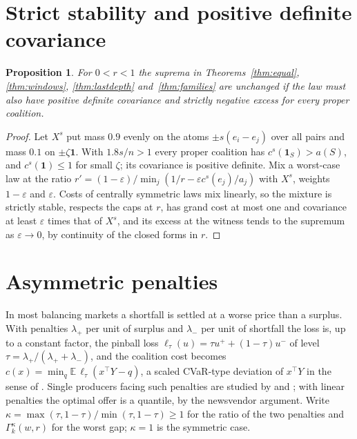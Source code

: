 \documentclass[11pt,a4paper]{article}
\newtheorem{proposition}[theorem]{Proposition}
\theoremstyle{remark}
\newcommand{\one}{\mathbf 1}
\newcommand{\E}{\mathbb E}
\begin{document}
\section{Strict stability and positive definite covariance}

\begin{proposition}\label{prop:mixtures}
For $0<r<1$ the suprema in Theorems~\ref{thm:equal}, \ref{thm:windows},
\ref{thm:lastdepth} and~\ref{thm:families} are unchanged if the law must also
have positive definite covariance and strictly negative excess for every proper
coalition.
\end{proposition}

\begin{proof}
Let $X^s$ put mass $0.9$ evenly on the atoms $\pm s(e_i-e_j)$ over all pairs
and mass $0.1$ on $\pm\zeta\one$. With $1.8s/n>1$ every proper coalition has
$c^s(\one_S)>a(S)$, and $c^s(\one)\le1$ for small $\zeta$; its covariance is
positive definite. Mix a worst-case law at the ratio
$r'=(1-\varepsilon)/\min_j(1/r-\varepsilon c^s(e_j)/a_j)$ with $X^s$, weights
$1-\varepsilon$ and $\varepsilon$. Costs of centrally symmetric laws mix
linearly, so the mixture is strictly stable, respects the caps at $r$, has
grand cost at most one and covariance at least $\varepsilon$ times that of
$X^s$, and its excess at the witness tends to the supremum as
$\varepsilon\to0$, by continuity of the closed forms in $r$.
\end{proof}

\section{Asymmetric penalties}\label{sec:asym}

In most balancing markets a shortfall is settled at a worse price than a
surplus. With penalties $\lambda_+$ per unit of surplus and $\lambda_-$ per
unit of shortfall the loss is, up to a constant factor, the pinball loss
$\ell_\tau(u)=\tau u^++(1-\tau)u^-$ of level
$\tau=\lambda_+/(\lambda_++\lambda_-)$, and the coalition cost becomes
$c(x)=\min_q\E\,\ell_\tau(x^\top Y-q)$, a scaled CVaR-type deviation of
$x^\top Y$ in the sense of \citet{rockafellar2006deviations}. Single producers
facing such penalties are studied by \citet{pinson2007trading} and
\citet{bitar2012bringing}; with linear penalties the optimal offer is a
quantile, by the newsvendor argument. Write
$\kappa=\max(\tau,1-\tau)/\min(\tau,1-\tau)\ge1$ for the ratio of the two
penalties and $\Gamma_k^\kappa(w,r)$ for the worst gap; $\kappa=1$ is the
symmetric case.
\end{document}
